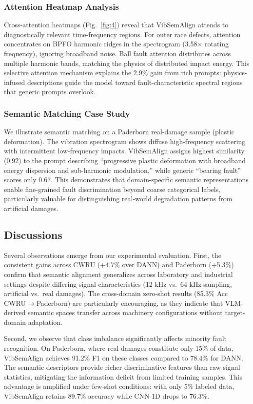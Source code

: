 \begin{table}[htbp]
\begin{table}[htbp]
\begin{table}[htbp]
\subsubsection{Attention Heatmap Analysis}
Cross-attention heatmaps (Fig.~\ref{fig:4}) reveal that VibSemAlign attends to diagnostically relevant time-frequency regions. For outer race defects, attention concentrates on BPFO harmonic ridges in the spectrogram (3.58$\times$ rotating frequency), ignoring broadband noise. Ball fault attention distributes across multiple harmonic bands, matching the physics of distributed impact energy. This selective attention mechanism explains the 2.9\% gain from rich prompts: physics-infused descriptions guide the model toward fault-characteristic spectral regions that generic prompts overlook.

\subsubsection{Semantic Matching Case Study}
We illustrate semantic matching on a Paderborn real-damage sample (plastic deformation). The vibration spectrogram shows diffuse high-frequency scattering with intermittent low-frequency impacts. VibSemAlign assigns highest similarity (0.92) to the prompt describing ``progressive plastic deformation with broadband energy dispersion and sub-harmonic modulation,'' while generic ``bearing fault'' scores only 0.67. This demonstrates that domain-specific semantic representations enable fine-grained fault discrimination beyond coarse categorical labels, particularly valuable for distinguishing real-world degradation patterns from artificial damages.

\subsection{Discussions}

Several observations emerge from our experimental evaluation. First, the consistent gains across CWRU (+4.7\% over DANN) and Paderborn (+5.3\%) confirm that semantic alignment generalizes across laboratory and industrial settings despite differing signal characteristics (12 kHz vs.\ 64 kHz sampling, artificial vs.\ real damages). The cross-domain zero-shot results (85.3\% Acc CWRU$\to$Paderborn) are particularly encouraging, as they indicate that VLM-derived semantic spaces transfer across machinery configurations without target-domain adaptation.

Second, we observe that class imbalance significantly affects minority fault recognition. On Paderborn, where real damages constitute only 15\% of data, VibSemAlign achieves 91.2\% F1 on these classes compared to 78.4\% for DANN. The semantic descriptors provide richer discriminative features than raw signal statistics, mitigating the information deficit from limited training samples. This advantage is amplified under few-shot conditions: with only 5\% labeled data, VibSemAlign retains 89.7\% accuracy while CNN-1D drops to 76.3\%.


\end{table}
\end{table}
\end{table}

